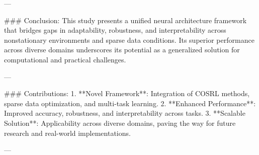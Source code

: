 ---

### Conclusion:
This study presents a unified neural architecture framework that bridges gaps in adaptability, robustness, and interpretability across nonstationary environments and sparse data conditions. Its superior performance across diverse domains underscores its potential as a generalized solution for computational and practical challenges.

---

### Contributions:
1. **Novel Framework**: Integration of COSRL methods, sparse data optimization, and multi-task learning.
2. **Enhanced Performance**: Improved accuracy, robustness, and interpretability across tasks.
3. **Scalable Solution**: Applicability across diverse domains, paving the way for future research and real-world implementations.

---